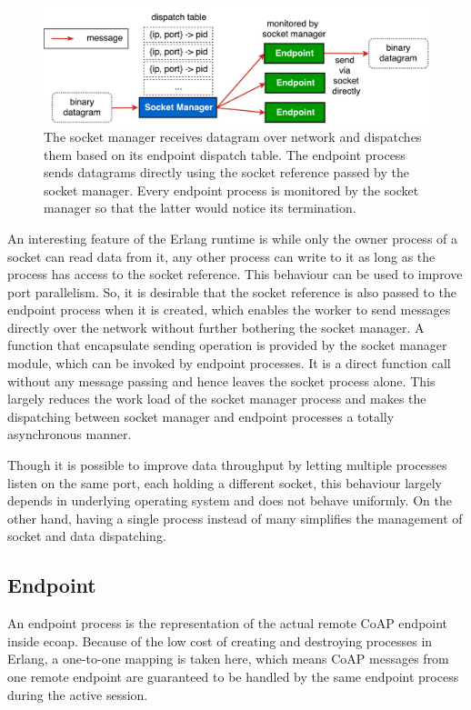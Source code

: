 \begin{figure}[!htbp]
\centering
\includegraphics[scale = 0.55]{coap_socket_manager}
\caption[The socket manager]{The socket manager receives datagram over network and dispatches them based on its endpoint dispatch table. The endpoint process sends datagrams directly using the socket reference passed by the socket manager. Every endpoint process is monitored by the socket manager so that the latter would notice its termination.}
\label{fig:coap_socket_manager}
\end{figure}

An interesting feature of the Erlang runtime is while only the owner process of a socket can read data from it, any other process can write to it as long as the process has access to the socket reference. This behaviour can be used to improve port parallelism. So, it is desirable that the socket reference is also passed to the endpoint process when it is created, which enables the worker to send messages directly over the network without further bothering the socket manager. A function that encapsulate sending operation is provided by the socket manager module, which can be invoked by endpoint processes. It is a direct function call without any message passing and hence leaves the socket process alone. This largely reduces the work load of the socket manager process and makes the dispatching between socket manager and endpoint processes a totally asynchronous manner.

Though it is possible to improve data throughput by letting multiple processes listen on the same port, each holding a different socket, this behaviour largely depends in underlying operating system and does not behave uniformly. On the other hand, having a single process instead of many simplifies the management of socket and data dispatching.

\subsection{Endpoint}\label{coap_endpoint}

An endpoint process is the representation of the actual remote CoAP endpoint inside ecoap. Because of the low cost of creating and destroying processes in Erlang, a one-to-one mapping is taken here, which means CoAP messages from one remote endpoint are guaranteed to be handled by the same endpoint process during the active session.

